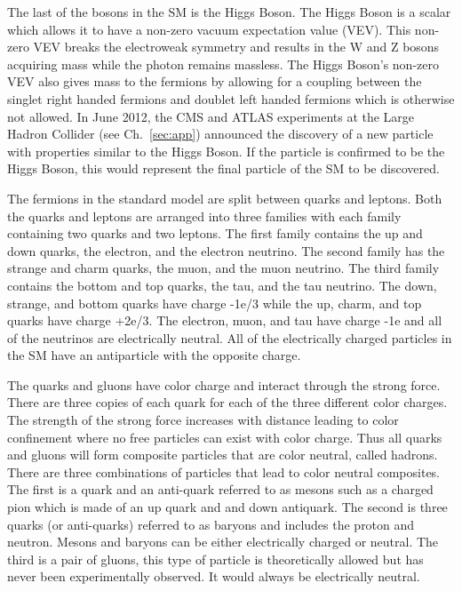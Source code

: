 The last of the bosons in the SM is the Higgs Boson. The Higgs Boson is a scalar which allows it to have a non-zero vacuum expectation value (VEV).
This non-zero VEV breaks the electroweak symmetry and results in the W and Z bosons acquiring mass while the photon remains massless.
The Higgs Boson's non-zero VEV also gives mass to the fermions by allowing for a coupling between the singlet right handed fermions and doublet left handed fermions
which is otherwise not allowed.
In June 2012, the CMS and ATLAS experiments at the Large Hadron Collider
(see Ch.~\ref{sec:app}) announced the discovery of a new particle with properties similar to the Higgs Boson. If the particle is confirmed
to be the Higgs Boson, this would represent the final particle of the SM to be discovered.

The fermions in the standard model are split between quarks and leptons. Both the quarks and leptons are arranged into three families
with each family containing two quarks and two leptons. 
The first family contains the up and down quarks, the electron, and the electron neutrino.
The second family has the strange and charm quarks, the muon, and the muon neutrino. The third family contains the bottom and top quarks,
the tau, and the tau neutrino. The down, strange, and bottom quarks have charge -1e/3 while the up, charm, and top quarks have charge +2e/3.
The electron, muon, and tau have charge -1e and all of the neutrinos are electrically neutral. All of the electrically charged particles in the SM have
an antiparticle with the opposite charge.


The quarks and gluons have color charge and interact through the strong force. There are three copies of each quark for each of the three different color charges.
The strength of the strong force increases with distance leading to color confinement where no free particles can exist with color charge.
Thus all quarks and gluons will form composite particles that are color neutral, called hadrons. There are three combinations of particles that lead to color
neutral composites. The first is a quark and an anti-quark referred to as mesons such as a charged pion which is made of an up quark and and down antiquark.
The second is three quarks (or anti-quarks) referred to as baryons and includes the proton and neutron.
Mesons and baryons can be either electrically charged or neutral.
The third is a pair of gluons, this type of particle is theoretically allowed but has never been experimentally observed. It would always be electrically neutral.


